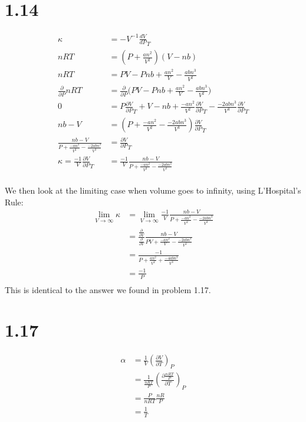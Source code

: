 \documentclass[10pt]{article} %
\begin{document}
\clearpage

\section{1.14}

\begin{align}
  \kappa &= -V^{-1}\frac{dV}{dP}_T\\
  nRT &= (P+\frac{an^2}{V^2})(V-nb)\\
  nRT &= PV - Pnb + \frac{an^2}{V} - \frac{abn^3}{V^2}\\
  \frac{\partial}{\partial P}nRT &= \frac{\partial}{\partial P} \Big(PV - Pnb + \frac{an^2}{V} - \frac{abn^3}{V^2} \Big)\\
  0 &= P\frac{\partial V}{\partial P}_T + V - nb + \frac{-an^2}{V^2}\frac{\partial V}{\partial P}_T - \frac{-2abn^3}{V^3}\frac{\partial V}{\partial P}_T\\
  nb - V &= (P + \frac{-an^2}{V^2} - \frac{-2abn^3}{V^3}) \frac{\partial V}{\partial P}_T\\
  \frac{nb - V}{P + \frac{-an^2}{V^2} - \frac{-2abn^3}{V^3}} &= \frac{\partial V}{\partial P}_T\\
  \kappa = \frac{-1}{V}\frac{\partial V}{\partial P}_T &= \frac{-1}{V}\frac{nb - V}{P + \frac{-an^2}{V^2} - \frac{-2abn^3}{V^3}}\\
\end{align}

We then look at the limiting case when volume goes to infinity, using L'Hospital's Rule: \\

\begin{align}
  \lim_{V\to \infty} \kappa &= \lim_{V\to \infty} \frac{-1}{V}\frac{nb - V}{P + \frac{-an^2}{V^2} - \frac{-2abn^3}{V^3}}\\
  &= \frac{\frac{\partial}{\partial V}}{\frac{\partial}{\partial V}} \frac{nb - V}{PV + \frac{-an^2}{V} - \frac{-2abn^3}{V^2}}\\
  &= \frac{-1}{P + \frac{an^2}{V^2} + \frac{-4abn^3}{V^3}}\\
  &= \frac{-1}{P}\\
\end{align}
This is identical to the answer we found in problem 1.17.

\section{1.17}

\begin{align}
  \alpha &= \frac{1}{V}(\frac{\partial V}{\partial T})_P\\
  &= \frac{1}{\frac{nRT}{P}}(\frac{\partial \frac{nRT}{P}}{\partial T})_P\\
  &= \frac{P}{nRT} \frac{nR}{P}\\
  &= \frac{1}{T}\\
\end{align}
\end{document}
